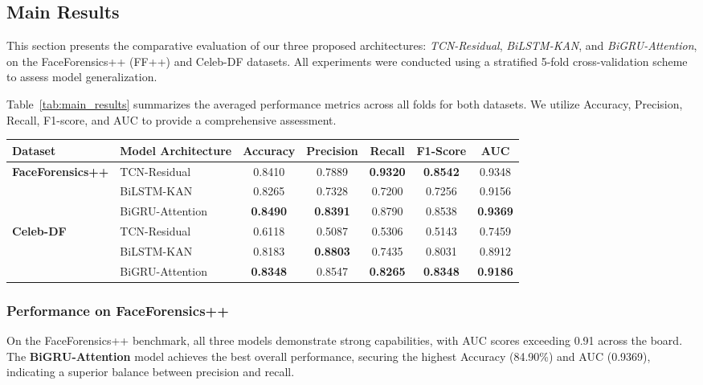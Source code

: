 \documentclass[conference]{IEEEtran}
\begin{document}
\subsection{Main Results}
This section presents the comparative evaluation of our three proposed architectures: \textit{TCN-Residual}, \textit{BiLSTM-KAN}, and \textit{BiGRU-Attention}, on the FaceForensics++ (FF++) and Celeb-DF datasets. All experiments were conducted using a stratified 5-fold cross-validation scheme to assess model generalization.

Table~\ref{tab:main_results} summarizes the averaged performance metrics across all folds for both datasets. We utilize Accuracy, Precision, Recall, F1-score, and AUC to provide a comprehensive assessment.



\begin{strip}
\centering
{}
\label{tab:main_results}
\setlength{\tabcolsep}{6pt}
\renewcommand{\arraystretch}{1.2}
\begin{tabular}{l l c c c c c}
\hline
\textbf{Dataset} & \textbf{Model Architecture} & \textbf{Accuracy} & \textbf{Precision} & \textbf{Recall} & \textbf{F1-Score} & \textbf{AUC} \\
\hline
\multirow{3}{*}{\textbf{FaceForensics++}}
& TCN-Residual    & 0.8410 & 0.7889 & \textbf{0.9320} & \textbf{0.8542} & 0.9348 \\
& BiLSTM-KAN       & 0.8265 & 0.7328 & 0.7200          & 0.7256          & 0.9156 \\
& BiGRU-Attention  & \textbf{0.8490} & \textbf{0.8391} & 0.8790 & 0.8538 & \textbf{0.9369} \\
\hline
\multirow{3}{*}{\textbf{Celeb-DF}}
& TCN-Residual    & 0.6118 & 0.5087 & 0.5306          & 0.5143          & 0.7459 \\
& BiLSTM-KAN       & 0.8183 & \textbf{0.8803} & 0.7435 & 0.8031 & 0.8912 \\
& BiGRU-Attention  & \textbf{0.8348} & 0.8547 & \textbf{0.8265} & \textbf{0.8348} & \textbf{0.9186} \\
\hline
\end{tabular}
\end{strip}


\subsubsection{Performance on FaceForensics++}
On the FaceForensics++ benchmark, all three models demonstrate strong capabilities, with AUC scores exceeding 0.91 across the board. The \textbf{BiGRU-Attention} model achieves the best overall performance, securing the highest Accuracy (84.90\%) and AUC (0.9369), indicating a superior balance between precision and recall. 
\end{document}
